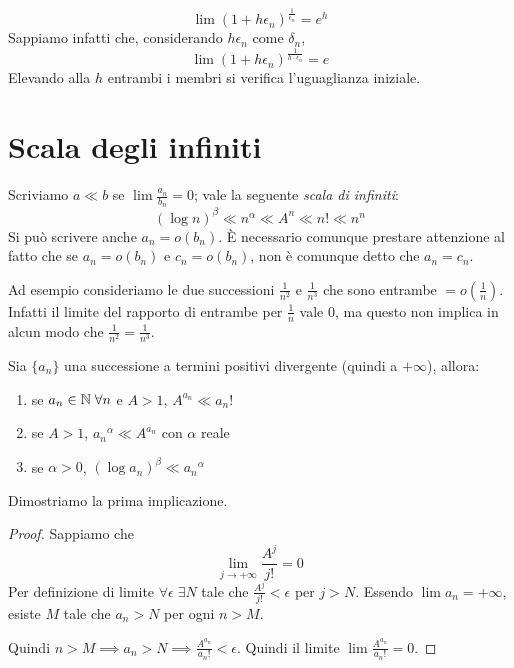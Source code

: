 \begin{remark}
\begin{equation*}
\lim (1+h\epsilon_n)^\frac{1}{\epsilon_n} = e^h
\end{equation*}
Sappiamo infatti che, considerando $h\epsilon_n$ come $\delta_n$, 
\begin{equation*}
\lim (1+h\epsilon_n)^\frac{1}{h\cdot\epsilon_n} = e
\end{equation*}
Elevando alla $h$ entrambi i membri si verifica l'uguaglianza iniziale.
\end{remark}

\section{Scala degli infiniti}
Scriviamo $a \ll b$ se $\lim \frac{a_n}{b_n} = 0$; vale la seguente \emph{scala di infiniti}:
\begin{equation*}
(\log n)^\beta \ll n^\alpha \ll A^n \ll n! \ll n^n
\end{equation*}
Si può scrivere anche $a_n = o(b_n)$. È necessario comunque prestare attenzione al fatto che se $a_n = o(b_n)$ e $c_n = o(b_n)$, non è comunque detto che $a_n = c_n$. 

Ad esempio consideriamo le due successioni $\frac{1}{n^2}$ e $\frac{1}{n^3}$ che sono entrambe $=o(\frac{1}{n})$. Infatti il limite del rapporto di entrambe per $\frac{1}{n}$ vale 0, ma questo non implica in alcun modo che $\frac{1}{n^2} = \frac{1}{n^3}$.

\begin{proposition}
Sia $\{a_n\}$ una successione a termini positivi divergente (quindi a $+\infty$), allora:
\begin{enumerate}
\item se $a_n \in \mathbb N \; \forall n$ e $A > 1$, $A^{a_n} \ll a_n!$
\item se $A > 1$, ${a_n}^\alpha \ll A^{a_n}$ con $\alpha$ reale
\item se $\alpha > 0$, $(\log a_n)^\beta \ll {a_n}^\alpha$
\end{enumerate}
\end{proposition}

Dimostriamo la prima implicazione.

\begin{proof}
Sappiamo che
\begin{equation*}
\lim_{j \to +\infty} \frac{A^j}{j!} = 0
\end{equation*}
Per definizione di limite $\forall \epsilon \; \exists N$ tale che $\frac{A^j}{j!} < \epsilon$ per $j > N$. Essendo $\lim a_n = +\infty$, esiste $M$ tale che $a_n > N$ per ogni $n > M$.

Quindi $n > M \implies a_n > N \implies \frac{A^{a_n}}{a_n!} < \epsilon$. Quindi il limite $\lim \frac{A^{a_n}}{a_n!} = 0$.
\end{proof}


